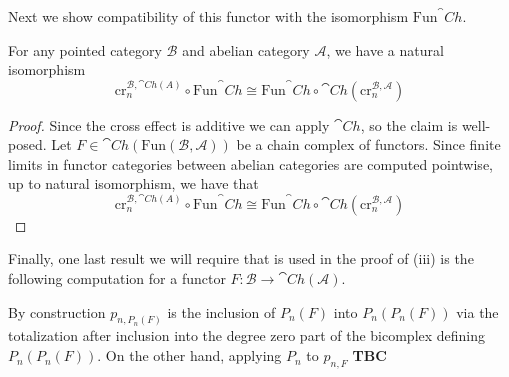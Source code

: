 Next we show compatibility of this functor with the isomorphism $\text{Fun}^\cat{Ch}$.

\begin{lem}[label=lem:ChFuncCommute]
    For any pointed category $\mathcal{B}$ and abelian category $\mathcal{A}$, we have a natural isomorphism
    \begin{equation*}
        \text{cr}_n^{\mathcal{B},\cat{Ch}(A)}\circ \text{Fun}^\cat{Ch} \cong \text{Fun}^\cat{Ch}\circ \cat{Ch}(\text{cr}_n^{\mathcal{B},\mathcal{A}})
    \end{equation*}
\end{lem}
\begin{proof}
    Since the cross effect is additive we can apply $\cat{Ch}$, so the claim is well-posed. Let $F\in\cat{Ch}(\text{Fun}(\mathcal{B},\mathcal{A}))$ be a chain complex of functors. Since finite limits in functor categories between abelian categories are computed pointwise, up to natural isomorphism, we have that 
    \begin{equation*}
        \text{cr}_n^{\mathcal{B},\cat{Ch}(A)}\circ \text{Fun}^\cat{Ch} \cong \text{Fun}^\cat{Ch}\circ \cat{Ch}(\text{cr}_n^{\mathcal{B},\mathcal{A}})
    \end{equation*}
\end{proof}

Finally, one last result we will require that is used in the proof of (iii) is the following computation for a functor $F:\mathcal{B}\rightarrow \cat{Ch}(\mathcal{A})$.

\begin{rmk}
    By construction $p_{n,P_n(F)}$ is the inclusion of $P_n(F)$ into $P_n(P_n(F))$ via the totalization after inclusion into the degree zero part of the bicomplex defining $P_n(P_n(F))$. On the other hand, applying $P_n$ to $p_{n,F}$ \textbf{TBC}
\end{rmk}

